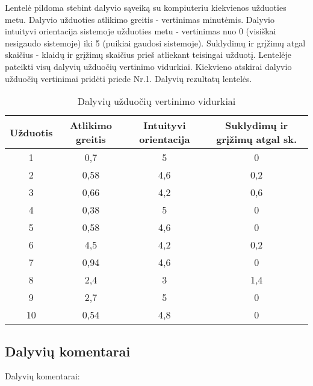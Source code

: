 		Lentelė pildoma stebint dalyvio sąveiką su kompiuteriu kiekvienos užduoties metu.
		Dalyvio užduoties atlikimo greitis - vertinimas minutėmis.
		Dalyvio intuityvi orientacija sistemoje užduoties metu - vertinimas nuo 0 (visiškai nesigaudo sistemoje) iki 5 (puikiai gaudosi sistemoje).
		Suklydimų ir grįžimų atgal skaičius - klaidų ir grįžimų skaičius prieš atliekant teisingai užduotį.
		Lentelėje pateikti visų dalyvių užduočių vertinimo vidurkiai.
		Kiekvieno atskirai dalyvio užduočių vertinimai pridėti priede Nr.1. Dalyvių rezultatų lentelės.
	
	\begin{table}[ht] 
		\caption{Dalyvių užduočių vertinimo vidurkiai} %
		\centering %
		\begin{tabular}{c c c c} %
			\hline\hline %
			Užduotis & Atlikimo greitis & Intuityvi orientacija  & Suklydimų ir grįžimų atgal sk.\\ [0.5pt] %
			\hline %
			1 & 0,7 & 5 & 0\\
			2 & 0,58 & 4,6 & 0,2\\
			3 & 0,66 & 4,2 & 0,6\\
			4 & 0,38 & 5 & 0\\
			5 & 0,58 & 4,6 & 0\\
			6 & 4,5 & 4,2 & 0,2\\
			7 & 0,94 & 4,6 & 0\\
			8 & 2,4 & 3 & 1,4\\
			9 & 2,7 & 5 & 0\\
			10 & 0,54 & 4,8 & 0\\
			\hline %
		\end{tabular} 
		\label{table:vertintojai} %
	\end{table} 
	
	\subsection{Dalyvių komentarai}
	
		Dalyvių komentarai:
		

